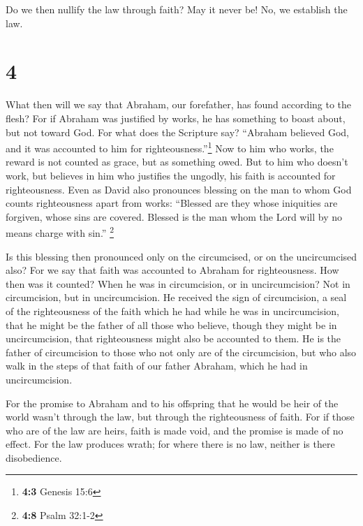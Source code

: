  Do we then nullify the law through faith? May it never
be! No, we establish the law.

\hypertarget{section-3}{%
\section{4}\label{section-3}}

 What then will we say that Abraham, our forefather, has
found according to the flesh?  For if Abraham was
justified by works, he has something to boast about, but not toward God.
 For what does the Scripture say? ``Abraham believed God,
and it was accounted to him for righteousness.''\footnote{\textbf{4:3}
  Genesis 15:6}  Now to him who works, the reward is not
counted as grace, but as something owed.  But to him who
doesn't work, but believes in him who justifies the ungodly, his faith
is accounted for righteousness.  Even as David also
pronounces blessing on the man to whom God counts righteousness apart
from works:  ``Blessed are they whose iniquities are
forgiven, whose sins are covered.  Blessed is the man whom
the Lord will by no means charge with sin.'' \footnote{\textbf{4:8}
  Psalm 32:1-2}

 Is this blessing then pronounced only on the circumcised,
or on the uncircumcised also? For we say that faith was accounted to
Abraham for righteousness.  How then was it counted? When
he was in circumcision, or in uncircumcision? Not in circumcision, but
in uncircumcision.  He received the sign of circumcision,
a seal of the righteousness of the faith which he had while he was in
uncircumcision, that he might be the father of all those who believe,
though they might be in uncircumcision, that righteousness might also be
accounted to them.  He is the father of circumcision to
those who not only are of the circumcision, but who also walk in the
steps of that faith of our father Abraham, which he had in
uncircumcision.

 For the promise to Abraham and to his offspring that he
would be heir of the world wasn't through the law, but through the
righteousness of faith.  For if those who are of the law
are heirs, faith is made void, and the promise is made of no effect.
 For the law produces wrath; for where there is no law,
neither is there disobedience.

